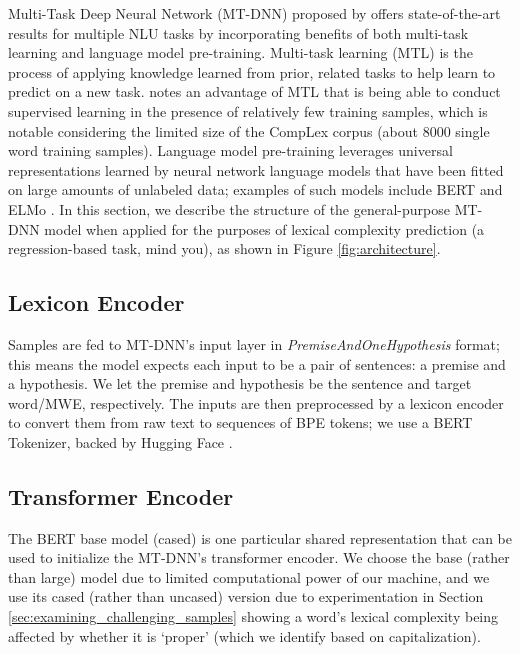 \documentclass{dcthesis}
\theoremstyle{definition}
\theoremstyle{remark}
\begin{document}
Multi-Task Deep Neural Network (MT-DNN) proposed by \citet{liu2019multi} offers state-of-the-art results for multiple NLU tasks by incorporating benefits of both multi-task learning and language model pre-training. Multi-task learning (MTL) is the process of applying knowledge learned from prior, related tasks to help learn to predict on a new task. \citet{liu2019multi} notes an advantage of MTL that is being able to conduct supervised learning in the presence of relatively few training samples, which is notable considering the limited size of the CompLex corpus (about 8000 single word training samples). Language model pre-training leverages universal representations learned by neural network language models that have been fitted on large amounts of unlabeled data; examples of such models include BERT \citep{devlin2018bert} and ELMo \citep{peters2018deep}. In this section, we describe the structure of the general-purpose MT-DNN model when applied for the purposes of lexical complexity prediction (a regression-based task, mind you), as shown in Figure \ref{fig:architecture}. 

\subsection{Lexicon Encoder}

Samples are fed to MT-DNN's input layer in \textit{PremiseAndOneHypothesis} format; this means the model expects each input to be a pair of sentences: a premise and a hypothesis. We let the premise and hypothesis be the sentence and target word/MWE, respectively. The inputs are then preprocessed by a lexicon encoder to convert them from raw text to sequences of BPE tokens; we use a BERT Tokenizer, backed by Hugging Face \citep{wolf2020transformers}.

\subsection{Transformer Encoder}

The BERT base model (cased) is one particular shared representation that can be used to initialize the MT-DNN's transformer encoder. We choose the base (rather than large) model due to limited computational power of our machine, and we use its cased (rather than uncased) version due to experimentation in Section \ref{sec:examining_challenging_samples} showing a word's lexical complexity being affected by whether it is `proper' (which we identify based on capitalization).
\end{document}
